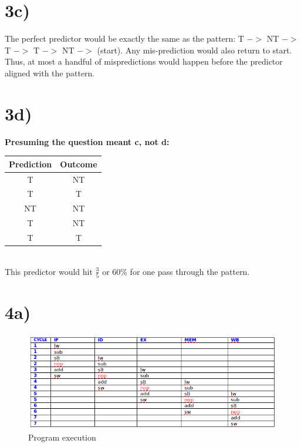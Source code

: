 \documentclass[a4paper,11pt]{article}
\begin{document}
\section*{3c)}
The perfect predictor would be exactly the same as the pattern: T $->$ NT $->$ T $->$ T $->$ NT $->$ (start).  Any mis-prediction would also return to start.
Thus, at most a handful of mispredictions would happen before the predictor aligned with the pattern.

\section*{3d)}
{\bf Presuming the question meant c, not d:} \\

\begin{tabular}{| c | c |}
  \hline	
  	Prediction & Outcome \\ \hline \hline
	T & NT \\ \hline
	T & T \\ \hline
	NT & NT \\ \hline
	T & NT \\ \hline
	T & T \\ \hline
\end{tabular} \\

This predictor would hit $\frac{3}{5}$ or 60\% for one pass through the pattern.


\section*{4a)}

\begin{figure}[h!]
\caption{Program execution} 
\centering
\includegraphics[width=1.1\textwidth]{hw7_p4a.png}
\end{figure}
\end{document}
